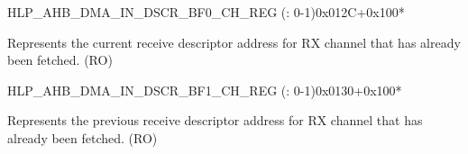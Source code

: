 \begin{register}{H}{LP\_AHB\_DMA\_IN\_DSCR\_BF0\_CH\_REG (: 0-1)}{0x012C+0x100*}\label{regdesc:LPAHBDMAINDSCRBF0CHNREG}
%
\regnewline%
\begin{regdesc}\begin{reglist}
\label{fielddesc:LPAHBDMAINLINKDSCRBF0CHN}\item [LP\_AHB\_DMA\_INLINK\_DSCR\_BF0\_CH\regindex{n}] Represents the current receive descriptor address for RX channel  that has already been fetched. (RO)
\end{reglist}\end{regdesc}
\end{register}


\begin{register}{H}{LP\_AHB\_DMA\_IN\_DSCR\_BF1\_CH\_REG (: 0-1)}{0x0130+0x100*}\label{regdesc:LPAHBDMAINDSCRBF1CHNREG}
%
\regnewline%
\begin{regdesc}\begin{reglist}
\label{fielddesc:LPAHBDMAINLINKDSCRBF1CHN}\item [LP\_AHB\_DMA\_INLINK\_DSCR\_BF1\_CH\regindex{n}] Represents the previous receive descriptor address for RX channel  that has already been fetched. (RO)
\end{reglist}\end{regdesc}
\end{register}


